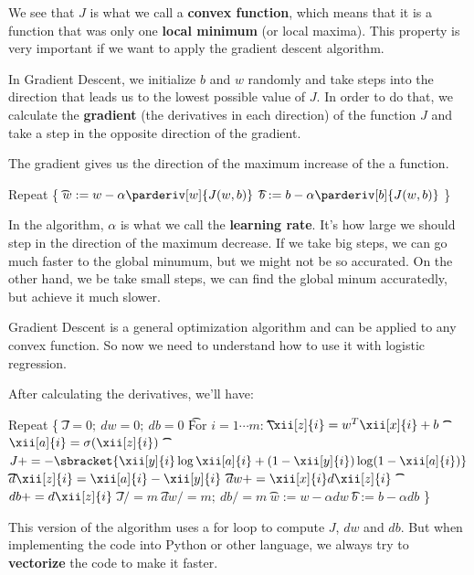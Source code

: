 \documentclass[12pt, a4paper, oneside]{book}
\begin{document}
We see that $J$ is what we call a \textbf{convex function}, which means that it
is a function that was only one \textbf{local minimum} (or local maxima). This
property is very important if we want to apply the gradient descent algorithm.

In Gradient Descent, we initialize $b$ and $w$ randomly and take steps into the
direction that leads us to the lowest possible value of $J$. In order to do
that, we calculate the \textbf{gradient} (the derivatives in each direction) of
the function $J$ and take a step in the opposite direction of the gradient.

\begin{prop}
The gradient gives us the direction of the maximum increase of the a function.
\end{prop}

\begin{algorithm}
Repeat \{ \nl
\t $w:=w-\alpha\parderiv[w]{J(w,b)}$ \nl
\t $b:=b-\alpha\parderiv[b]{J(w,b)}$ \nl
\}
\end{algorithm}

In the algorithm, $\alpha$ is what we call the \textbf{learning rate}. It's how
large we should step in the direction of the maximum decrease. If we take big
steps, we can go much faster to the global minumum, but we might not be so
accurated. On the other hand, we be take small steps, we can find the global
minum accuratedly, but achieve it much slower.

Gradient Descent is a general optimization algorithm and can be applied to any
convex function. So now we need to understand how to use it with logistic
regression.

After calculating the derivatives, we'll have:

\begin{algorithm}
Repeat \{ \nl
\t$J=0;~dw=0;~db=0$ \nl
\t For $i=1\cdots m$:\nl
\t\t $\xii[z]{i}=w^{T}\xii[x]{i}+b$\nl
\t\t $\xii[a]{i}=\sigma(\xii[z]{i})$\nl
\t\t $J+=
-\sbracket{\xii[y]{i}\log\xii[a]{i}+(1-\xii[y]{i})\log(1-\xii[a]{i})}$\nl
\t\t $d\xii[z]{i}=\xii[a]{i}-\xii[y]{i}$\nl
\t\t $dw += \xii[x]{i}d\xii[z]{i}$\nl
\t\t $db += d\xii[z]{i}$\nl
\t $J/=m$\nl
\t $dw/=m;~db/=m$\nl
\t $w:=w-\alpha dw$ \nl
\t $b:=b-\alpha db$ \nl
\}
\end{algorithm}

This version of the algorithm uses a for loop to compute $J$, $dw$ and $db$. But
when implementing the code into Python or other language, we always try to
\textbf{vectorize} the code to make it faster.
\end{document}

